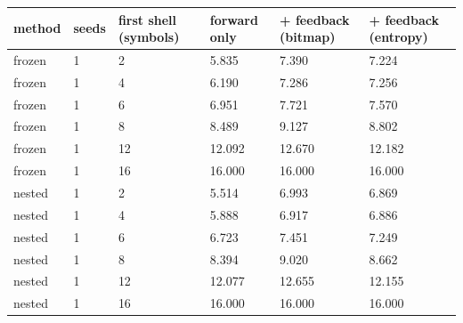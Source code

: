\begin{tabular}{llllll}
\hline
method & seeds & first shell (symbols) & forward only & + feedback (bitmap) & + feedback (entropy) \\
\hline
frozen & 1 & 2 & 5.835 & 7.390 & 7.224 \\
frozen & 1 & 4 & 6.190 & 7.286 & 7.256 \\
frozen & 1 & 6 & 6.951 & 7.721 & 7.570 \\
frozen & 1 & 8 & 8.489 & 9.127 & 8.802 \\
frozen & 1 & 12 & 12.092 & 12.670 & 12.182 \\
frozen & 1 & 16 & 16.000 & 16.000 & 16.000 \\
nested & 1 & 2 & 5.514 & 6.993 & 6.869 \\
nested & 1 & 4 & 5.888 & 6.917 & 6.886 \\
nested & 1 & 6 & 6.723 & 7.451 & 7.249 \\
nested & 1 & 8 & 8.394 & 9.020 & 8.662 \\
nested & 1 & 12 & 12.077 & 12.655 & 12.155 \\
nested & 1 & 16 & 16.000 & 16.000 & 16.000 \\
\hline
\end{tabular}
